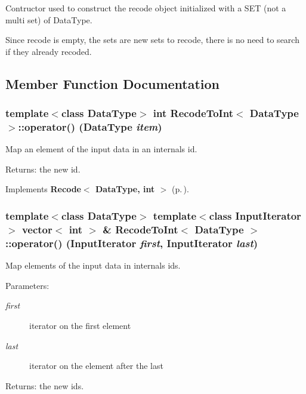 Contructor used to construct the recode object initialized with a SET (not a multi set) of Data\-Type. 

Since recode is empty, the sets are new sets to recode, there is no need to search if they already recoded. 

\subsection{Member Function Documentation}
\subsubsection{\setlength{\rightskip}{0pt plus 5cm}template$<$class Data\-Type$>$ int {\bf Recode\-To\-Int}$<$ Data\-Type $>$::operator() (Data\-Type {\em item})\hspace{0.3cm}{\tt  [virtual]}}\label{class_recode_to_int_84e738bd2a7faf92a7d916e995689cab}


Map an element of the input data in an internals id. 

\begin{Desc}
\item[Returns:]the new id. \end{Desc}


Implements {\bf Recode$<$ Data\-Type, int $>$} {\rm (p.\,\pageref{class_recode_266e8a09b4576e02aab3cd6590a9ffbf})}.
\subsubsection{\setlength{\rightskip}{0pt plus 5cm}template$<$class Data\-Type$>$ template$<$class Input\-Iterator$>$ vector$<$ int $>$ \& {\bf Recode\-To\-Int}$<$ Data\-Type $>$::operator() (Input\-Iterator {\em first}, Input\-Iterator {\em last})}\label{class_recode_to_int_51f3193e2ace542f3041ee0f3dca8deb}


Map elements of the input data in internals ids. 

\begin{Desc}
\item[Parameters:]
\begin{description}
\item[{\em first}]iterator on the first element \item[{\em last}]iterator on the element after the last \end{description}
\end{Desc}
\begin{Desc}
\item[Returns:]the new ids. \end{Desc}
